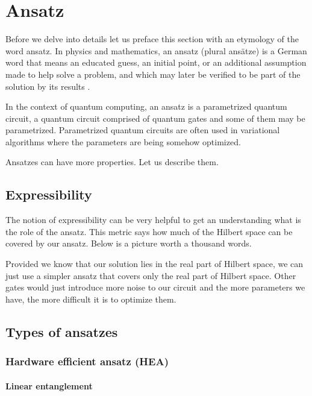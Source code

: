 \chapter{Ansatz}\label{ch:ansatz}
Before we delve into details let us preface this section with an etymology of the word ansatz. In physics and mathematics, an ansatz (plural ansätze) is a German word that means an educated guess, an initial point, or an additional assumption made to help solve a problem, and which may later be verified to be part of the solution by its results \cite{ansatz_etymology}.

In the context of quantum computing, an ansatz is a parametrized quantum circuit,  a quantum circuit comprised of quantum gates and some of them may be parametrized. Parametrized quantum circuits are often used in variational algorithms where the parameters are being somehow optimized.

Ansatzes can have more properties. Let us describe them.
\section{Expressibility}
The notion of expressibility can be very helpful to get an understanding what is the role of the ansatz. This metric says how much of the Hilbert space can be covered by our ansatz. Below is a picture worth a thousand words.

Provided we know that our solution lies in the real part of Hilbert space, we can just use a simpler ansatz that covers only the real part of Hilbert space. Other gates would just introduce more noise to our circuit and the more parameters we have, the more difficult it is to optimize them.

\section{Types of ansatzes}
\subsection{Hardware efficient ansatz (HEA)}
\subsubsection{Linear entanglement}
